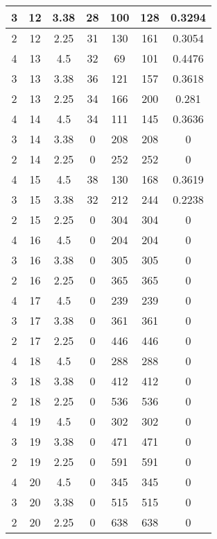 \documentclass[letterpaper, 12pt]{article}
\begin{document}
\begin{longtable}{|c|c|c|c|c|c|c|}
\hline
3 & 12 & 3.38 & 28 & 100 & 128 & 0.3294 \\
\hline
2 & 12 & 2.25 & 31 & 130 & 161 & 0.3054 \\
\hline
4 & 13 & 4.5 & 32 & 69 & 101 & 0.4476 \\
\hline
3 & 13 & 3.38 & 36 & 121 & 157 & 0.3618 \\
\hline
2 & 13 & 2.25 & 34 & 166 & 200 & 0.281 \\
\hline
4 & 14 & 4.5 & 34 & 111 & 145 & 0.3636 \\
\hline
3 & 14 & 3.38 & 0 & 208 & 208 & 0 \\
\hline
2 & 14 & 2.25 & 0 & 252 & 252 & 0 \\
\hline
4 & 15 & 4.5 & 38 & 130 & 168 & 0.3619 \\
\hline
3 & 15 & 3.38 & 32 & 212 & 244 & 0.2238 \\
\hline
2 & 15 & 2.25 & 0 & 304 & 304 & 0 \\
\hline
4 & 16 & 4.5 & 0 & 204 & 204 & 0 \\
\hline
3 & 16 & 3.38 & 0 & 305 & 305 & 0 \\
\hline
2 & 16 & 2.25 & 0 & 365 & 365 & 0 \\
\hline
4 & 17 & 4.5 & 0 & 239 & 239 & 0 \\
\hline
3 & 17 & 3.38 & 0 & 361 & 361 & 0 \\
\hline
2 & 17 & 2.25 & 0 & 446 & 446 & 0 \\
\hline
4 & 18 & 4.5 & 0 & 288 & 288 & 0 \\
\hline
3 & 18 & 3.38 & 0 & 412 & 412 & 0 \\
\hline
2 & 18 & 2.25 & 0 & 536 & 536 & 0 \\
\hline
4 & 19 & 4.5 & 0 & 302 & 302 & 0 \\
\hline
3 & 19 & 3.38 & 0 & 471 & 471 & 0 \\
\hline
2 & 19 & 2.25 & 0 & 591 & 591 & 0 \\
\hline
4 & 20 & 4.5 & 0 & 345 & 345 & 0 \\
\hline
3 & 20 & 3.38 & 0 & 515 & 515 & 0 \\
\hline
2 & 20 & 2.25 & 0 & 638 & 638 & 0 \\
\hline
\end{longtable}
\end{document}
